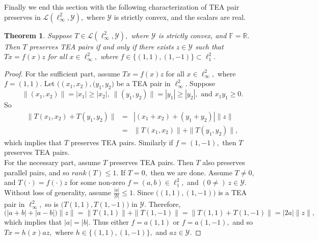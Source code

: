 \documentclass{amsart}
\newtheorem{theorem}{Theorem}[section]
\theoremstyle{definition}
\theoremstyle{remark}
\numberwithin{equation}{section}
\begin{document}
Finally we end this section with the following characterization of TEA pair preserves in $ \mathcal{L}(\ell_\infty^2,\mathcal{Y}),$ where $\mathcal{Y}$ is strictly convex, and the scalars are real.
\begin{theorem}\label{th-n2p}
	Suppose $T\in \mathcal{L}(\ell_\infty^2,\mathcal{Y}),$  where $\mathcal{Y}$ is strictly convex, %
	and $\mathbb{F}=\mathbb{R}.$ Then $T$ preserves TEA pairs if and only if there exists $z\in \mathcal{Y}$ such that $Tx=f(x)z$ for all $x\in \ell_\infty^2,$ where $f\in \{(1,1),(1,-1)\}\subset \ell_1^2.$ 
\end{theorem}
\begin{proof}
For the sufficient part, assume 	$Tx=f(x)z$ for all $x\in \ell_\infty^2,$ where $f=(1,1).$ Let $\Big((x_1,x_2),(y_1,y_2\Big)$ be a TEA pair in $\ell_\infty^2.$ 
Suppose $$\|(x_1,x_2)\|=|x_1|\geq |x_2|,~\|(y_1,y_2)\|=|y_1|\geq |y_2|, \text{ and }x_1y_1\geq 0.$$ So 
\begin{eqnarray*}
\|T(x_1,x_2)+T(y_1,y_2)\|%
&=&	|(x_1+x_2)+(y_1+y_2)|\|z\|\\
	&=&\|T(x_1,x_2)\|+\|T(y_1,y_2)\|,
\end{eqnarray*}
which implies that $T$ preserves TEA pairs. Similarly if $f=(1,-1),$ then  $T$ preserves TEA pairs.\\
For the necessary part, assume $T$ preserves TEA pairs. Then $T$ also preserves parallel pairs, and so $rank(T)\leq 1.$ If $T=0,$ then we are done.  Assume  $T\neq 0,$ and $T(\cdot)=f(\cdot)z$ for some non-zero $f=(a,b)\in \ell_1^2,$ and $(0\neq)~z\in \mathcal{Y}.$ Without loss of generality, assume $\frac{|a|}{|b|}\leq 1.$ Since $\Big((1,1),(1,-1)\Big)$ is a TEA pair in $\ell_\infty^2,$ so is $\Big(T(1,1),T(1,-1)\Big)$ in $\mathcal{Y}.$ Therefore,
\[\Big(|a+b|+|a-b|\Big)\|z\|=\|T(1,1)\|+\|T(1,-1)\|=\|T(1,1)+T(1,-1)\|=|2a|\|z\|,\]
which implies that $|a|=|b|.$ Thus either $f=a(1,1)$ or $f=a(1,-1),$ and so $Tx=h(x)az,$ where $h\in \{(1,1),(1,-1)\},$ and $az\in \mathcal{Y}.$  
\end{proof}
\end{document}
